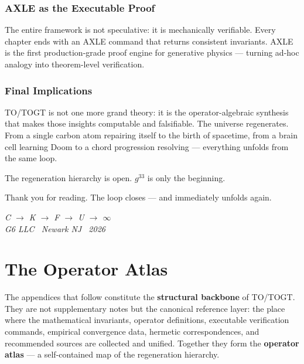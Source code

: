 \subsection*{AXLE as the Executable Proof}

The entire framework is not speculative: it is mechanically verifiable. Every chapter ends with an AXLE command that returns consistent invariants. AXLE is the first production-grade proof engine for generative physics --- turning ad-hoc analogy into theorem-level verification.

\subsection*{Final Implications}

TO/TOGT is not one more grand theory: it is the operator-algebraic synthesis that makes those insights computable and falsifiable. The universe regenerates. From a single carbon atom repairing itself to the birth of spacetime, from a brain cell learning Doom to a chord progression resolving --- everything unfolds from the same loop.

The regeneration hierarchy is open. $g^{33}$ is only the beginning.

Thank you for reading. The loop closes --- and immediately unfolds again.

\vspace{0.5cm}
\begin{center}
\itshape
C \;$\to$\; K \;$\to$\; F \;$\to$\; U \;$\to$\; $\infty$\\[0.3em]
\normalfont\small G6 LLC \textperiodcentered\ Newark NJ
\textperiodcentered\ 2026
\end{center}

\backmatter   %

\appendix     %

\chapter{The Operator Atlas}

The appendices that follow constitute the \textbf{structural backbone} of TO/TOGT. They are not supplementary notes but the canonical reference layer: the place where the mathematical invariants, operator definitions, executable verification commands, empirical convergence data, hermetic correspondences, and recommended sources are collected and unified. Together they form the \textbf{operator atlas} --- a self-contained map of the regeneration hierarchy.

